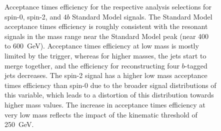 \begin{figure}[ht]
\centering
\vspace*{-3cm}

\caption{\label{fig:a-times-e} Acceptance times efficiency for the respective analysis selections for 
spin-0, spin-2, and $4b$ Standard Model signals. The Standard Model acceptance times efficiency is roughly 
consistent with the resonant signals in the mass range near the Standard Model peak (near 400 to \SI{600}{\GeV}). 
Acceptance times efficiency at low mass is mostly limited by the trigger, whereas for higher masses, the 
jets start to merge together, and the efficiency for reconstructing four $b$-tagged jets decreases.
The spin-2 signal has a higher low mass acceptance times efficiency than spin-0 due to the broader signal 
distributions of this variable, which leads to a distortion of this distribution towards higher mass values. 
The increase in acceptance times efficiency at very low mass reflects the impact of the kinematic threshold of 
\SI{250}{\GeV}.}
\end{figure}

